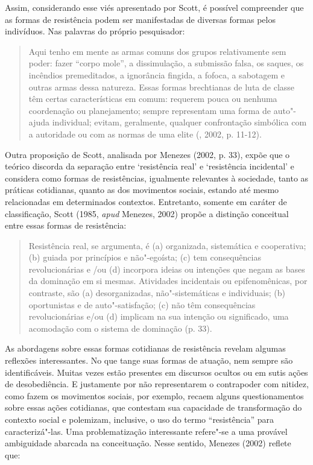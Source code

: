 Assim, considerando esse viés apresentado por Scott, é possível
compreender que as formas de resistência podem ser manifestadas de
diversas formas pelos indivíduos. Nas palavras do próprio pesquisador:

\begin{quote}
Aqui tenho em mente as armas comuns dos grupos relativamente sem poder:
fazer ``corpo mole'', a dissimulação, a submissão falsa, os saques, os
incêndios premeditados, a ignorância fingida, a fofoca, a sabotagem e
outras armas dessa natureza. Essas formas brechtianas de luta de classe
têm certas características em comum: requerem pouca ou nenhuma
coordenação ou planejamento; sempre representam uma forma de auto"-ajuda
individual; evitam, geralmente, qualquer confrontação simbólica com a
autoridade ou com as normas de uma elite (, 2002, p. 11-12).
\end{quote}

Outra proposição de Scott, analisada por Menezes (2002, p. 33), expõe que o
teórico discorda da separação entre `resistência real' e `resistência
incidental' e considera como formas de resistências, igualmente
relevantes à sociedade, tanto as práticas cotidianas, quanto as dos
movimentos sociais, estando até mesmo relacionadas em determinados
contextos. Entretanto, somente em caráter de classificação, Scott (1985,
\emph{apud} Menezes, 2002) propõe a distinção conceitual entre essas
formas de resistência:

\begin{quote}
Resistência real, se argumenta, é (a) organizada, sistemática e
cooperativa; (b) guiada por princípios e não"-egoísta; (c) tem
consequências revolucionárias e /ou (d) incorpora ideias ou intenções
que negam as bases da dominação em si mesmas. Atividades incidentais ou
epifenomênicas, por contraste, são (a) desorganizadas, não"-sistemáticas
e individuais; (b) oportunistas e de auto"-satisfação; (c) não têm
consequências revolucionárias e/ou (d) implicam na sua intenção ou
significado, uma acomodação com o sistema de dominação (p. 33).
\end{quote}

As abordagens sobre essas formas cotidianas de resistência revelam
algumas reflexões interessantes. No que tange suas formas de atuação,
nem sempre são identificáveis. Muitas vezes estão presentes em discursos
ocultos ou em sutis ações de desobediência. E justamente por não
representarem o contrapoder com nitidez, como fazem os movimentos
sociais, por exemplo, recaem alguns questionamentos sobre essas ações
cotidianas, que contestam sua capacidade de transformação do contexto
social e polemizam, inclusive, o uso do termo ``resistência'' para
caracterizá"-las. Uma problematização interessante refere"-se a uma
provável ambiguidade abarcada na conceituação. Nesse sentido, Menezes
(2002) reflete que:

